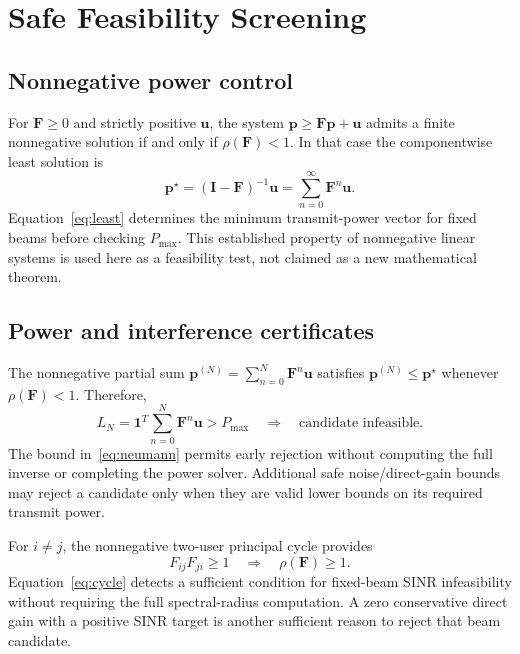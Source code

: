 \documentclass[journal]{IEEEtran}
\begin{document}
\section{Safe Feasibility Screening}
\subsection{Nonnegative power control}
For $\mathbf F\ge0$ and strictly positive $\mathbf u$, the system $\mathbf p\ge\mathbf F\mathbf p+\mathbf u$ admits a finite nonnegative solution if and only if $\rho(\mathbf F)<1$. In that case the componentwise least solution is
\begin{equation}
 \mathbf p^\star=(\mathbf I-\mathbf F)^{-1}\mathbf u
 =\sum_{n=0}^{\infty}\mathbf F^n\mathbf u.
 \label{eq:least}
\end{equation}
Equation~\eqref{eq:least} determines the minimum transmit-power vector for fixed beams before checking $P_{\max}$. This established property of nonnegative linear systems is used here as a feasibility test, not claimed as a new mathematical theorem.

\subsection{Power and interference certificates}
The nonnegative partial sum $\mathbf p^{(N)}=\sum_{n=0}^{N}\mathbf F^n\mathbf u$ satisfies $\mathbf p^{(N)}\le\mathbf p^\star$ whenever $\rho(\mathbf F)<1$. Therefore,
\begin{equation}
 L_N=\mathbf1^T\sum_{n=0}^{N}\mathbf F^n\mathbf u>P_{\max}
 \quad\Longrightarrow\quad\text{candidate infeasible}.
 \label{eq:neumann}
\end{equation}
The bound in~\eqref{eq:neumann} permits early rejection without computing the full inverse or completing the power solver. Additional safe noise/direct-gain bounds may reject a candidate only when they are valid lower bounds on its required transmit power.

For $i\ne j$, the nonnegative two-user principal cycle provides
\begin{equation}
 F_{ij}F_{ji}\ge1\quad\Longrightarrow\quad\rho(\mathbf F)\ge1.
 \label{eq:cycle}
\end{equation}
Equation~\eqref{eq:cycle} detects a sufficient condition for fixed-beam SINR infeasibility without requiring the full spectral-radius computation. A zero conservative direct gain with a positive SINR target is another sufficient reason to reject that beam candidate.
\end{document}
